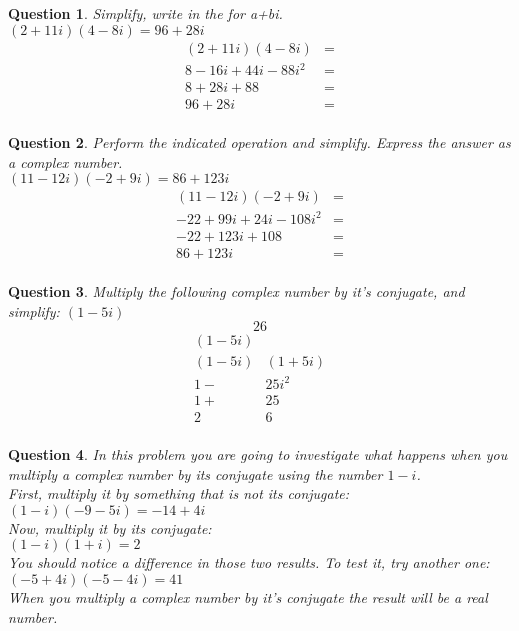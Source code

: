 \documentclass{amsart}
\newtheorem{question}{Question}
\begin{document}
	\begin{question}
		Simplify, write in the for a+bi.\\
		$(2+11i)(4-8i)=\boxed{96+28i}$
		\[\begin{aligned}
			(2+11i)(4-8i)&=\\
			8-16i+44i-88i^2&=\\
			8+28i+88&=\\
			96+28i&=\\
		\end{aligned}\]
	\end{question}
	\begin{question}
		Perform the indicated operation and simplify.
		Express the answer as a complex number.\\
		$(11-12i)(-2+9i)=\boxed{86+123i}$
		\[\begin{aligned}
			(11-12i)(-2+9i)&=\\
			-22+99i+24i-108i^2&=\\
			-22+123i+108&=\\
			86+123i&=\\
		\end{aligned}\]
	\end{question}
	\begin{question}
		Multiply the following complex number by it's conjugate, and simplify: $(1-5i)$
		$$\boxed{26}$$
		\[\begin{aligned}
			(1-5i)&\\
			(1-5i)&(1+5i)\\
			1-&25i^2\\
			1+&25\\
			2&6\\
		\end{aligned}\]
	\end{question}
	\begin{question}
		 In this problem you are going to investigate what happens when you multiply a complex number by its conjugate using the number $1-i$.\\
		  First, multiply it by something that is not its conjugate: \\
		  $(1-i)(-9-5i)=\boxed{-14+4i}$\\
		  Now, multiply it by its conjugate: \\
		  $(1-i)(1+i)=\boxed{2}$\\
		  You should notice a difference in those two results. To test it, try another one: \\
		  $(-5+4i)(-5-4i)=\boxed{41}$\\
		  When you multiply a complex number by it's conjugate
		  the result will be a real number.
	\end{question}
\end{document}
